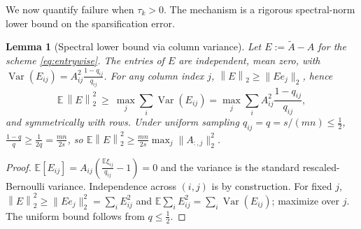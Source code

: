 \documentclass{amsart}
\newtheorem{lemma}{Lemma}
\theoremstyle{definition}
\DeclareMathOperator{\Var}{Var}
\newcommand{\Op}[1]{\left\lVert #1\right\rVert_2}
\newcommand{\Atil}{\widetilde{A}}
\newcommand{\E}{\mathbb{E}}
\begin{document}
We now quantify failure when $\tau_k>0$. The mechanism is a rigorous
spectral-norm lower bound on the sparsification error.

\begin{lemma}[Spectral lower bound via column variance]\label{lem:colvar}
Let $E:=\Atil-A$ for the scheme \eqref{eq:entrywise}. The entries of $E$ are
independent, mean zero, with $\Var(E_{ij})=A_{ij}^2\frac{1-q_{ij}}{q_{ij}}$.
For any column index $j$, $\Op E\ge\|E e_j\|_2$, hence
\begin{equation}\label{eq:colvar}
\E\,\Op E^2\ \ge\ \max_j\sum_i\Var(E_{ij})
=\max_j\sum_i A_{ij}^2\frac{1-q_{ij}}{q_{ij}},
\end{equation}
and symmetrically with rows. Under uniform sampling $q_{ij}=q=s/(mn)\le\tfrac12$,
$\frac{1-q}{q}\ge\frac{1}{2q}=\frac{mn}{2s}$, so
$\E\Op E^2\ge\frac{mn}{2s}\max_j\|A_{:,j}\|_2^2$.
\end{lemma}

\begin{proof}
$\E[E_{ij}]=A_{ij}(\frac{\E\xi_{ij}}{q_{ij}}-1)=0$ and the variance is the
standard rescaled-Bernoulli variance. Independence across $(i,j)$ is by
construction. For fixed $j$, $\Op E^2\ge\|Ee_j\|_2^2=\sum_iE_{ij}^2$ and
$\E\sum_iE_{ij}^2=\sum_i\Var(E_{ij})$; maximize over $j$. The uniform bound
follows from $q\le\tfrac12$.
\end{proof}
\end{document}
